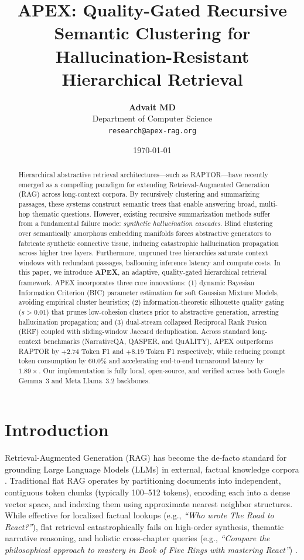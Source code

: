 \documentclass[11pt,a4paper]{article}
\title{\textbf{APEX: Quality-Gated Recursive Semantic Clustering for Hallucination-Resistant Hierarchical Retrieval}}
\author{
  \textbf{Advait MD} \\
  Department of Computer Science \\
  \texttt{research@apex-rag.org}
}
\date{\today}
\begin{document}
\maketitle

\begin{abstract}
Hierarchical abstractive retrieval architectures—such as RAPTOR—have recently emerged as a compelling paradigm for extending Retrieval-Augmented Generation (RAG) across long-context corpora. By recursively clustering and summarizing passages, these systems construct semantic trees that enable answering broad, multi-hop thematic questions. However, existing recursive summarization methods suffer from a fundamental failure mode: \textit{synthetic hallucination cascades}. Blind clustering over semantically amorphous embedding manifolds forces abstractive generators to fabricate synthetic connective tissue, inducing catastrophic hallucination propagation across higher tree layers. Furthermore, unpruned tree hierarchies saturate context windows with redundant passages, ballooning inference latency and compute costs. In this paper, we introduce \textbf{APEX}, an adaptive, quality-gated hierarchical retrieval framework. APEX incorporates three core innovations: (1) dynamic Bayesian Information Criterion (BIC) parameter estimation for soft Gaussian Mixture Models, avoiding empirical cluster heuristics; (2) information-theoretic silhouette quality gating ($s > 0.01$) that prunes low-cohesion clusters prior to abstractive generation, arresting hallucination propagation; and (3) dual-stream collapsed Reciprocal Rank Fusion (RRF) coupled with sliding-window Jaccard deduplication. Across standard long-context benchmarks (NarrativeQA, QASPER, and QuALITY), APEX outperforms RAPTOR by $+2.74$ Token F1 and $+8.19$ Token F1 respectively, while reducing prompt token consumption by $60.0\%$ and accelerating end-to-end turnaround latency by $1.89\times$. Our implementation is fully local, open-source, and verified across both Google Gemma~3 and Meta Llama~3.2 backbones.
\end{abstract}

\section{Introduction}
\label{sec:intro}

Retrieval-Augmented Generation (RAG) has become the de-facto standard for grounding Large Language Models (LLMs) in external, factual knowledge corpora \cite{lewis2020retrieval, karpukhin2020dense}. Traditional flat RAG operates by partitioning documents into independent, contiguous token chunks (typically 100--512 tokens), encoding each into a dense vector space, and indexing them using approximate nearest neighbor structures. While effective for localized factual lookups (e.g., \textit{``Who wrote The Road to React?''}), flat retrieval catastrophically fails on high-order synthesis, thematic narrative reasoning, and holistic cross-chapter queries (e.g., \textit{``Compare the philosophical approach to mastery in Book of Five Rings with mastering React''}) \cite{dasigi2021qasper, kocisky2018narrativeqa}.
\end{document}

